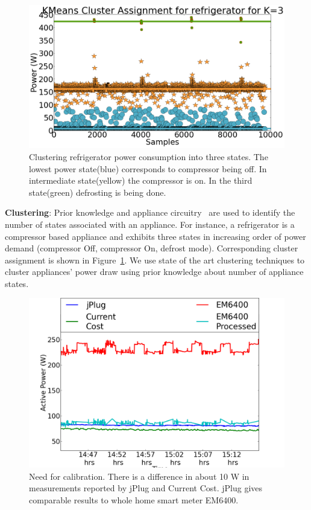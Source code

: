 \documentclass[conference]{IEEEtran}
\newcommand{\figref}[1]{Figure~\ref{#1}}
\begin{document}
\begin{figure}
\centering \includegraphics[scale=0.12]{./figures/clustering.png}
\vspace{-8pt}
\caption{Clustering refrigerator power consumption into three states. The lowest power state(blue) corresponds to compressor being off. In intermediate state(yellow) the compressor is on. In the third state(green) defrosting is being done.}
\vspace{-8pt}
   \label{fig:clustering}
   \vspace{-8pt}
\end{figure}

\noindent\textbf{Clustering}: Prior knowledge and appliance circuitry~\cite{ting2005} are used to identify the number of states associated with an appliance. For instance, a refrigerator is a compressor based appliance and exhibits three states in increasing order of power demand (compressor Off, compressor On, defrost mode). Corresponding cluster assignment is shown in \figref{fig:clustering}. We use state of the art clustering techniques to cluster appliances' power draw using prior knowledge about number of appliance states.
\begin{figure}
\centering \includegraphics[scale=0.12]{./figures/calibration.png}
\vspace{-8pt}
\caption{Need for calibration. There is a difference in about 10 W in measurements reported by jPlug and Current Cost. jPlug gives comparable results to whole home smart meter EM6400.}
\vspace{-20pt}
   \label{fig:calibration}
\end{figure}
\end{document}
